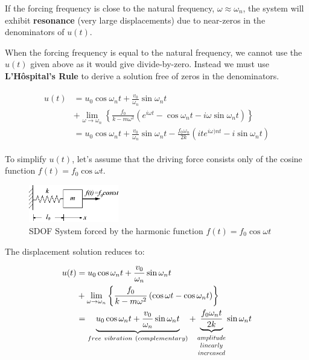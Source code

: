 \documentclass[10pt,b5paper,titlepage]{book}
\newcommand*{\Scale}[2][4]{\scalebox{#1}{$#2$}}%
\newenvironment{ematrix}
{
    \begin{eqnarray}
        \begin{aligned}
}
{
        \end{aligned}
    \end{eqnarray}
}
\begin{document}
If the forcing frequency is close to the natural frequency, $ \omega \approx \omega_n $,
the system will exhibit \textbf{resonance} (very large displacements) due to
near-zeros in the denominators of $ u(t) $.

When the forcing frequency is equal to the natural frequency, we cannot use the
$ u(t) $ given above as it would give divide-by-zero. Instead we must use
\textbf{L'H\^ospital's Rule} to derive a solution free of zeros in the denominators.

\begin{ematrix}
    u(t) &= u_0 \cos{\omega_n t} + \frac{v_0}{\omega_n} \sin{\omega_n t}\\
         &+ \lim_{\omega \rightarrow \omega_n} \left\{
             \frac{f_0}{k - m \omega^2} \left(
                 e^{i \omega t} - \cos{\omega_n t} - i \omega \sin{\omega_n t}
                 \right)
         \right\}\\
         &= u_0 \cos{\omega_n t} + \frac{v_0}{\omega_n} \sin{\omega_n t}
         - \frac{f_0 \omega_n}{2 k} \left(
             i t e^{i \omega)n t} - i \sin{\omega_n t}
             \right)
\end{ematrix}

To simplify $ u(t) $, let's assume that the driving force consists only of the
cosine function $ f(t) = f_0 \cos{\omega t} $.

\begin{figure}[ht]
    \centering
    \includegraphics[width=0.35\textwidth]{img/SDOF_harmonic_undamped.png}
    \caption{SDOF System forced by the harmonic function $ f(t) = f_0 \cos{\omega t} $}
    \label{fig:SDOF-harmonic-undamped-response-png}
\end{figure}

The displacement solution reduces to:

\begin{ematrix}
    u(t) &= u_0 \cos{\omega_n t} + \frac{v_0}{\omega_n} \sin{\omega_n t}\\
         &+ \lim_{\omega \rightarrow \omega_n} \left\{
             \frac{f_0}{k - m \omega^2} \left(
                 \cos{\omega t} - \cos{\omega_n t}
                 \right)
         \right\}\\
         &= \underbrace{u_0 \cos{\omega_n t} + \frac{v_0}{\omega_n} \sin{\omega_n t}}_{
         free\ vibration\ (complementary)}
         + \underbrace{\frac{f_0 \omega_n t}{2 k}}_{\Scale[0.75]{
             \begin{matrix}
                 amplitude\\
                 linearly\\
                 increased
             \end{matrix}}}
         \sin{\omega_n t}
\end{ematrix}
\end{document}

